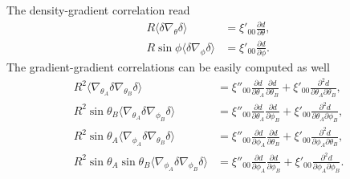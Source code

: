 \documentclass[useAMS,usenatbib,babel,superscriptaddress]{mnras}
\newcommand{\mean}[1]{
  \langle #1
  \rangle}
\begin{document}
The density-gradient correlation read
\begin{align}
  R\mean{\delta \nabla_\theta \delta} & = \xi'_{00}\frac{\partial d}{\partial\theta},\\
  R\sin\phi\mean{\delta \nabla_\phi \delta} & = \xi'_{00}\frac{\partial d}{\partial\phi}.
\end{align}
The gradient-gradient correlations can be easily computed as well
\begin{align}
  R^2\mean{\nabla_{\theta_A}\delta\nabla_{\theta_B}\delta} &= \xi''_{00}\frac{\partial d}{\partial \theta_A}\frac{\partial d}{\partial \theta_B} + \xi'_{00}\frac{\partial^2d}{\partial\theta_A\partial\theta_B}, \\
  R^2\sin\theta_B\mean{\nabla_{\theta_A}\delta\nabla_{\phi_B}\delta} &= \xi''_{00}\frac{\partial d}{\partial \theta_A}\frac{\partial d}{\partial \phi_B} + \xi'_{00}\frac{\partial^2d}{\partial\theta_A\partial\phi_B}, \\
  R^2\sin\theta_A\mean{\nabla_{\phi_A}\delta\nabla_{\theta_B}\delta} &= \xi''_{00}\frac{\partial d}{\partial \phi_A}\frac{\partial d}{\partial \theta_B} + \xi'_{00}\frac{\partial^2d}{\partial\phi_A\partial\theta_B}, \\
  R^2\sin\theta_A\sin\theta_B\mean{\nabla_{\phi_A}\delta\nabla_{\phi_B}\delta} &= \xi''_{00}\frac{\partial d}{\partial \phi_A}\frac{\partial d}{\partial \phi_B} + \xi'_{00}\frac{\partial^2d}{\partial\phi_A\partial\phi_B}.
\end{align}
\end{document}
